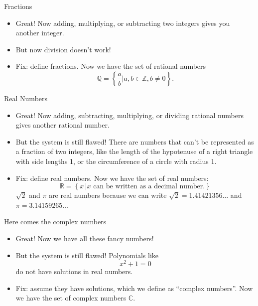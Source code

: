 \begin{frame}{Fractions}
  \begin{itemize}
  \item Great! Now adding, multiplying, or subtracting two integers gives you another integer.
  \item But now division doesn't work!
  \item Fix: define fractions. Now we have the set of rational numbers 
  \[\mathbb{Q} = \left\{\frac{a}{b} \Big| a,b \in \mathbb{Z}, b \neq 0 \right\}.\]
  \end{itemize}
\end{frame}

\begin{frame}{Real Numbers}
  \begin{itemize}
  \item Great! Now adding, subtracting, multiplying, or dividing rational numbers gives another rational number.
  \item But the system is still flawed! There are numbers that can't be represented as a fraction of two integers, like the length of the hypotenuse of a right triangle with side lengths 1, or the circumference of a circle with radius 1.
  \begin{figure}[h!]
  \centering
  \end{figure}
  \item Fix: define real numbers. Now we have the set of real numbers:
\[\mathbb{R} = \left\{ x \, \Big| x \text{ can be written as a decimal number.}\right\} \]
$\sqrt{2}$ and $\pi$ are real numbers because we can write $\sqrt{2} = 1.41421356\ldots$ and $\pi = 3.14159265\ldots$
  \end{itemize}
\end{frame}

\begin{frame}{Here comes the complex numbers}
  \begin{itemize}
  \item Great! Now we have all these fancy numbers!
  \item But the system is still flawed! Polynomials like
  \[x^2+1 = 0\]
  do not have solutions in real numbers.
  \item Fix: assume they have solutions, which we define as ``complex numbers''. Now we have the set of complex numbers $\mathbb{C}$.
  \end{itemize}
\end{frame}

